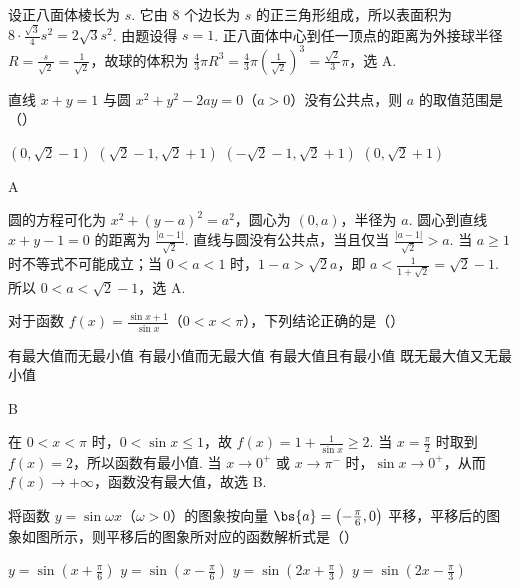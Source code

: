 \begin{solution}
设正八面体棱长为 \(s\). 它由 \(8\) 个边长为 \(s\) 的正三角形组成，所以表面积为 \(8\cdot\frac{\sqrt3}{4}s^2=2\sqrt3s^2\). 由题设得 \(s=1\). 正八面体中心到任一顶点的距离为外接球半径 \(R=\frac{s}{\sqrt2}=\frac{1}{\sqrt2}\)，故球的体积为 \(\frac43\pi R^3=\frac43\pi\left(\frac{1}{\sqrt2}\right)^3=\frac{\sqrt2}{3}\pi\)，选 A.
\end{solution}

\begin{problem}
直线 \(x + y = 1\) 与圆 \(x^{2} + y^{2} - 2ay = 0\)（\(a > 0\)）没有公共点，则 \(a\) 的取值范围是（\quad）

\choices
    {\((0, \sqrt{2} - 1)\)}
    {\((\sqrt{2} - 1, \sqrt{2} + 1)\)}
    {\((- \sqrt{2} - 1, \sqrt{2} + 1)\)}
    {\((0, \sqrt{2} + 1)\)}
\end{problem}

\begin{answer}
A
\end{answer}

\begin{solution}
圆的方程可化为 \(x^2+(y-a)^2=a^2\)，圆心为 \((0,a)\)，半径为 \(a\). 圆心到直线 \(x+y-1=0\) 的距离为 \(\frac{|a-1|}{\sqrt2}\). 直线与圆没有公共点，当且仅当 \(\frac{|a-1|}{\sqrt2}>a\). 当 \(a\geq1\) 时不等式不可能成立；当 \(0<a<1\) 时，\(1-a>\sqrt2a\)，即 \(a<\frac{1}{1+\sqrt2}=\sqrt2-1\). 所以 \(0<a<\sqrt2-1\)，选 A.
\end{solution}

\begin{problem}
对于函数 \( f(x) = \frac{\sin x + 1}{\sin x} \)（\(0 < x < \pi\)），下列结论正确的是（\quad）

\choices
    {有最大值而无最小值}
    {有最小值而无最大值}
    {有最大值且有最小值}
    {既无最大值又无最小值}
\end{problem}

\begin{answer}
B
\end{answer}

\begin{solution}
在 \(0<x<\pi\) 时，\(0<\sin x\leq1\)，故 \(f(x)=1+\frac{1}{\sin x}\geq2\). 当 \(x=\frac\pi2\) 时取到 \(f(x)=2\)，所以函数有最小值. 当 \(x\to0^+\) 或 \(x\to\pi^-\) 时，\(\sin x\to0^+\)，从而 \(f(x)\to+\infty\)，函数没有最大值，故选 B.
\end{solution}

\begin{problem}
将函数 \( y = \sin \omega x \)（\(\omega > 0\)）的图象按向量 \( \bs{a} = \left(-\frac{\pi}{6}, 0\right) \) 平移，平移后的图象如图所示，则平移后的图象所对应的函数解析式是（\quad）


\choices
    {\(y = \sin \left(x + \frac{\pi}{6}\right)\)}
    {\(y = \sin \left(x - \frac{\pi}{6}\right)\)}
    {\( y = \sin \left(2x + \frac{\pi}{3}\right) \)}
    {\(y = \sin \left(2x - \frac{\pi}{3}\right)\)}
\end{problem}

